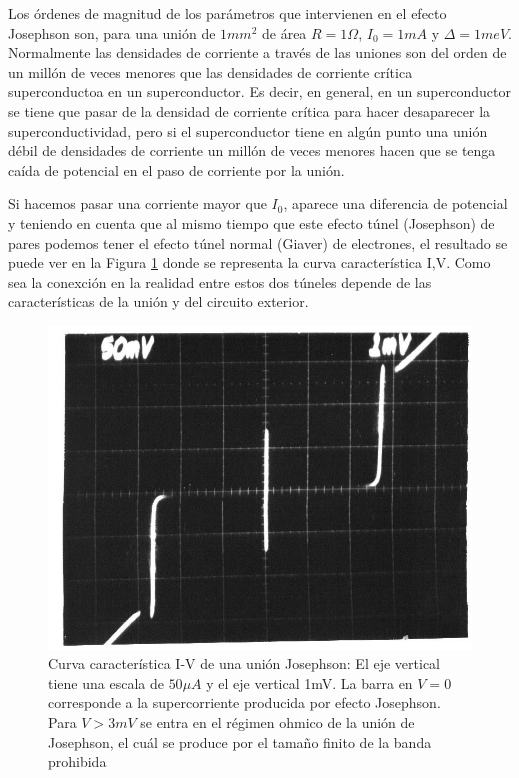 Los órdenes de magnitud de los parámetros que intervienen en el efecto Josephson son, para una unión de $1mm^2$ de área $R = 1 \Omega$, $I_0 = 1 mA$ y $\Delta = 1meV$. Normalmente las densidades de corriente a través de las uniones son del orden de un millón de veces menores que las densidades de corriente crítica superconductoa en un superconductor. Es decir, en general, en un superconductor se tiene que pasar de la densidad de corriente crítica para hacer desaparecer la superconductividad, pero si el superconductor tiene en algún punto una unión débil de densidades de corriente un millón de veces menores hacen que se tenga caída de potencial en el paso de corriente por la unión.

Si hacemos pasar una corriente mayor que $I_0$, aparece una diferencia de potencial y teniendo en cuenta que al mismo tiempo que este efecto túnel (Josephson) de pares podemos tener el efecto túnel normal (Giaver) de electrones, el resultado se puede ver en la Figura \ref{fig:ivjj} donde se representa la curva característica I,V. Como sea la conexción en la realidad entre estos dos túneles depende de las características de la unión y del circuito exterior.

\begin{figure}[H]
\centering \includegraphics[width=0.8\linewidth]{img/IVJJ.JPG}
\caption[Curva característica I-V de una unión Josephson]{Curva característica I-V de una unión Josephson: El eje vertical tiene una escala de $50\mu A$ y el eje vertical 1mV. La barra en $V=0$ corresponde a la supercorriente producida por efecto Josephson. Para $V > 3mV$ se entra en el régimen ohmico de la unión de Josephson, el cuál se produce por el tamaño finito de la banda prohibida}
\label{fig:ivjj}
\end{figure}

